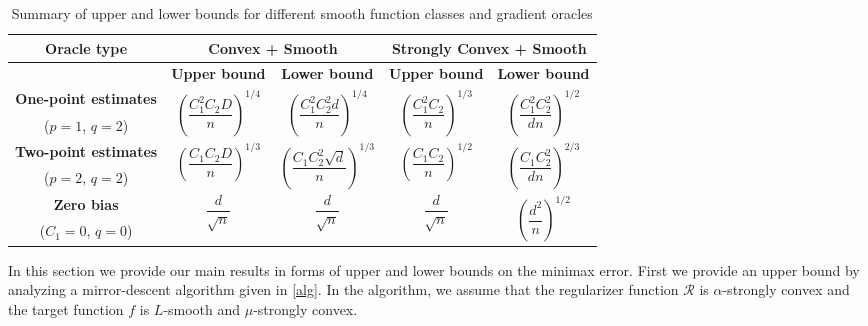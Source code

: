 \begin{table*}
\centering
 \caption{Summary of upper and lower bounds for different smooth function classes and  gradient oracles}
\label{tab:mse-1}
 \begin{tabular}{|c|c|c|c|c|}
\toprule
  \multirow{2}{*}{\textbf{Oracle type}} & \multicolumn{2}{c}{\multirow{2}{*}{\textbf{Convex + Smooth}}} & \multicolumn{2}{|c|}{\multirow{2}{*}{\textbf{Strongly Convex + Smooth}}} \\[1em]
 \midrule
 & \textbf{Upper bound} & \textbf{Lower bound} & \textbf{Upper bound} & \textbf{Lower bound}\\
 \midrule
\textbf{ One-point estimates} & \multirow{2}{*}{$\left(\dfrac{C_1^{2}C_2 D}{n}\right)^{1/4}$}  & \multirow{2}{*}{$\left(\dfrac{C_1^2 C_2^2 d}{n}\right)^{1/4}$}& \multirow{2}{*}{$\left(\dfrac{C_1^2 C_2}{n}\right)^{1/3}$}  & \multirow{2}{*}{$\left(\dfrac{C_1^2 C_2^2}{d n}\right)^{1/2}$} \\[0.5ex]
 ($p=1$, $q=2$) & & & &\\\midrule
\textbf{ Two-point estimates} & \multirow{2}{*}{$\left(\dfrac{C_1 C_2 D}{n}\right)^{1/3}$}  & \multirow{2}{*}{$\left(\dfrac{C_1 C_2^2 \sqrt d}{n}\right)^{1/3}$} & \multirow{2}{*}{$\left(\dfrac{C_1 C_2}{n}\right)^{1/2}$}  & \multirow{2}{*}{$\left(\dfrac{C_1 C_2^2 }{d n}\right)^{2/3}$}\\[1.4ex]
 ($p=2$, $q=2$) & & & &\\
  \midrule
 \textbf{Zero bias} & \multirow{2}{*}{$\dfrac{d}{\sqrt{n}}$}  & \multirow{2}{*}{$\dfrac{d}{\sqrt{n}}$} & \multirow{2}{*}{$\dfrac{d}{\sqrt{n}}$}  & \multirow{2}{*}{$\left(\dfrac{d^2}{n}\right)^{1/2}$}  \\[0.5ex]
 ($C_1=0$, $q=0$) & & & &\\\bottomrule
\end{tabular}
\end{table*}


In this section we provide our main results in forms of upper and lower bounds on the minimax error.
First we provide an upper bound by analyzing a mirror-descent algorithm given in \cref{alg}. 
In the algorithm, we assume that the regularizer function $\mathcal{R}$ is $\alpha$-strongly convex and the target function $f$ is $L$-smooth and $\mu$-strongly convex.

